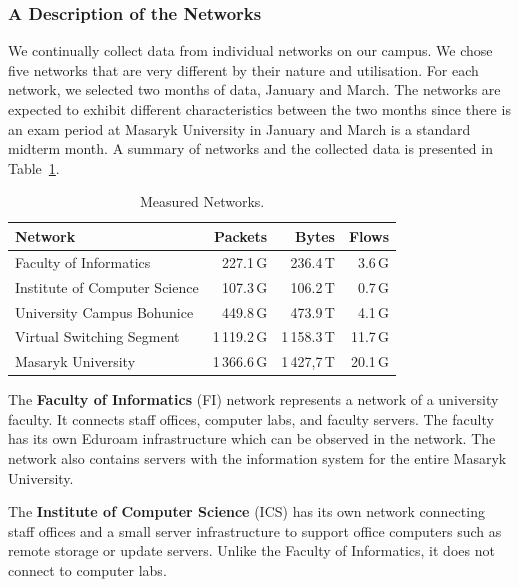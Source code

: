 \subsubsection{A Description of the Networks}

We continually collect data from individual networks on our campus. We chose five networks that are very different by their nature and utilisation. For each network, we selected two months of data, January and March. The networks are expected to exhibit different characteristics between the two months since there is an exam period at Masaryk University in January and March is a standard midterm month. A summary of networks and the collected data is presented in Table~\ref{tab:characterization-measured-networks}.

\begin{table}[!t]
        \centering
        \renewcommand{\arraystretch}{1.1}
        \begin{tabular}{|l|r|r|r|} \hline
            \textbf{Network} & \textbf{Packets} & \textbf{Bytes} & \textbf{Flows} \\ \hline
            Faculty of Informatics & 227.1\,G & 236.4\,T & 3.6\,G \\ \hline
            Institute of Computer Science & 107.3\,G & 106.2\,T & 0.7\,G \\ \hline
            University Campus Bohunice & 449.8\,G & 473.9\,T & 4.1\,G \\ \hline
            Virtual Switching Segment & 1\,119.2\,G & 1\,158.3\,T & 11.7\,G \\ \hline
            Masaryk University & 1\,366.6\,G & 1\,427,7\,T & 20.1\,G \\ \hline
        \end{tabular}
        \caption{Measured Networks.}
        \label{tab:characterization-measured-networks}
\end{table}

The \textbf{Faculty of Informatics} (FI) network represents a network of a university faculty. It connects staff offices, computer labs, and faculty servers. The faculty has its own Eduroam infrastructure which can be observed in the network. The network also contains servers with the information system for the entire Masaryk University.

The \textbf{Institute of Computer Science} (ICS) has its own network connecting staff offices and a small server infrastructure to support office computers such as remote storage or update servers. Unlike the Faculty of Informatics, it does not connect to computer labs. 

